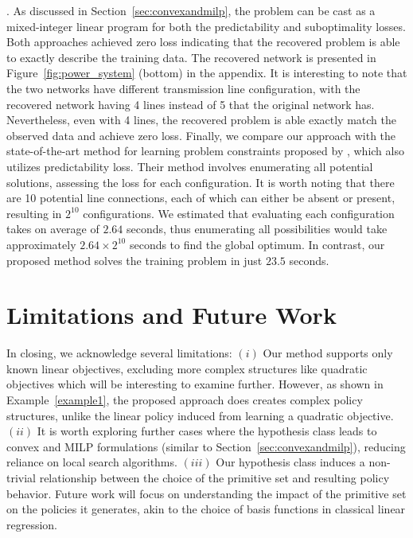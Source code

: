 \documentclass{article}
\theoremstyle{plain}
\begin{document}
. As discussed in Section~\ref{sec:convexandmilp}, the problem can be cast as a mixed-integer linear program for both the predictability and suboptimality losses. Both approaches achieved zero loss indicating that the recovered problem is able to exactly describe the training data. The recovered network is presented in Figure~\ref{fig:power_system} (bottom) in the appendix. It is interesting to note that the two networks have different transmission line configuration, with the recovered network having 4 lines instead of 5 that the original network has. Nevertheless, even with 4 lines, the recovered problem is able exactly match the observed data and achieve zero loss. Finally, we compare our approach with the state-of-the-art method for learning problem constraints proposed by \cite{aswani2018inverse}, which also utilizes predictability loss. Their method involves enumerating all potential solutions, assessing the loss for each configuration. It is worth noting that there are 10 potential line connections, each of which can either be absent or present, resulting in $2^{10}$ configurations. We estimated that evaluating each configuration takes on average of $2.64$ seconds, thus enumerating all possibilities would take approximately $2.64 \times 2^{10}$ seconds to find the global optimum. In contrast, our proposed method solves the training problem in just $23.5$ seconds.

 
 
 


\section{Limitations and Future Work}\label{sec:conclusion}
In closing, we acknowledge several limitations: $(i)$ Our method supports only known linear objectives, excluding more complex structures like quadratic objectives which will be interesting to examine further. However, as shown in Example~\ref{example1}, the proposed approach does creates complex policy structures, unlike the linear policy induced from learning a quadratic objective. $(ii)$ It is worth exploring further cases where the hypothesis class leads to convex and MILP formulations (similar to Section~\ref{sec:convexandmilp}), reducing reliance on local search algorithms. $(iii)$ Our hypothesis class induces a non-trivial relationship between the choice of the primitive set and resulting policy behavior. Future work will focus on understanding the impact of the primitive set on the policies it generates, akin to the choice of basis functions in classical linear regression.
\end{document}

